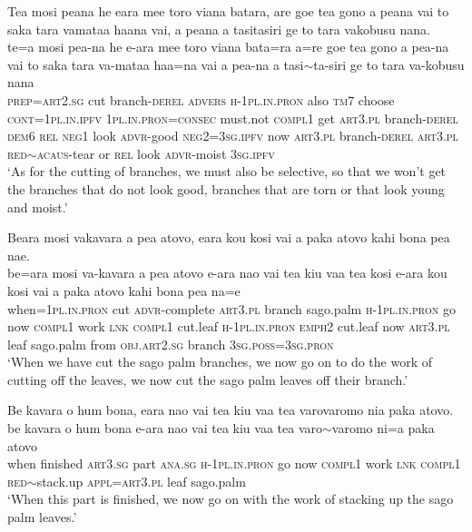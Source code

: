 \ea\label{ex:text12-7}
Tea mosi peana he eara mee toro viana batara, are goe tea gono a peana vai to saka tara vamataa haana vai, a peana a tasitasiri ge to tara vakobusu nana.\\
\gll te=a	mosi	pea-na	he	e-ara	mee	toro	viana	bata=ra	a=re	goe	tea	gono	a	pea-na	vai	to	saka	tara	va-mataa	haa=na	vai	a	pea-na	a	tasi{$\sim$}ta-siri	ge	to	tara	va-kobusu	nana\\
     \textsc{prep}=\textsc{art}2.\textsc{sg}	cut	branch-\textsc{derel}	\textsc{advers}	\textsc{h}-1\textsc{pl}.\textsc{in}.\textsc{pron}	also	\textsc{tm}7	choose	\textsc{cont}=1\textsc{pl}.\textsc{in}.\textsc{ipfv}	1\textsc{pl}.\textsc{in}.\textsc{pron}=\textsc{consec}	must.not	\textsc{compl}1	get	\textsc{art}3.\textsc{pl}	branch-\textsc{derel}	\textsc{dem}6	\textsc{rel}	\textsc{neg}1	look	\textsc{advr}-good	\textsc{neg}2=3\textsc{sg}.\textsc{ipfv}	now	\textsc{art}3.\textsc{pl}	branch-\textsc{derel}	\textsc{art}3.\textsc{pl}	\textsc{red}{$\sim$}\textsc{acaus}-tear	or	\textsc{rel}	look	\textsc{advr}-moist	3\textsc{sg}.\textsc{ipfv}\\
\glt `As for the cutting of branches, we must also be selective, so that we won't get the branches that do not look good, branches that are torn or that look young and moist.'
\z

\ea\label{ex:text12-8}
Beara mosi vakavara a pea atovo, eara kou kosi vai a paka atovo kahi bona pea nae.\\
\gll be=ara	mosi	va-kavara	a	pea	atovo	e-ara	nao	vai	tea	kiu	vaa	tea	kosi	e-ara	kou	kosi	vai	a	paka	atovo	kahi	bona	pea	na=e\\
     when=1\textsc{pl}.\textsc{in}.\textsc{pron}	cut	\textsc{advr}-complete	\textsc{art}3.\textsc{pl}	branch	sago.palm	\textsc{h}-1\textsc{pl}.\textsc{in}.\textsc{pron}	go	now	\textsc{compl}1	work	\textsc{lnk}	\textsc{compl}1	cut.leaf	\textsc{h}-1\textsc{pl}.\textsc{in}.\textsc{pron}	\textsc{emph}2	cut.leaf	now	\textsc{art}3.\textsc{pl}	leaf	sago.palm	from	\textsc{obj}.\textsc{art}2.\textsc{sg}	branch	3\textsc{sg}.\textsc{poss}=3\textsc{sg}.\textsc{pron}\\
\glt `When we have cut the sago palm branches, we now go on to do the work of cutting off the leaves, we now cut the sago palm leaves off their branch.'
\z

\ea\label{ex:text12-9}
Be kavara o hum bona, eara nao vai tea kiu vaa tea varovaromo nia paka atovo.\\
\gll be	kavara	o	hum	bona	e-ara	nao	vai	tea	kiu	vaa	tea	varo{$\sim$}varomo	ni=a	paka	atovo\\
     when	finished	\textsc{art}3.\textsc{sg}	part	\textsc{ana}.\textsc{sg}	\textsc{h}-1\textsc{pl}.\textsc{in}.\textsc{pron}	go	now	\textsc{compl}1	work	\textsc{lnk}	\textsc{compl}1	\textsc{red}{$\sim$}stack.up	\textsc{appl}=\textsc{art}3.\textsc{pl}	leaf	sago.palm\\
\glt `When this part is finished, we now go on with the work of stacking up the sago palm leaves.'
\z

